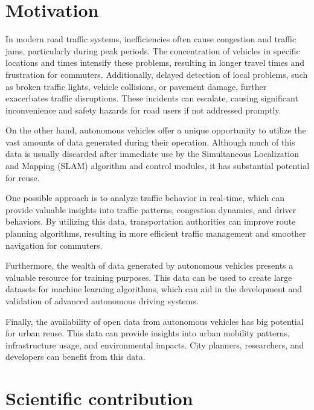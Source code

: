 \section{Motivation}

In modern road traffic systems, inefficiencies often cause congestion and traffic jams, particularly during peak periods. The concentration of vehicles in specific locations and times intensify these problems, resulting in longer travel times and frustration for commuters. Additionally, delayed detection of local problems, such as broken traffic lights, vehicle collisions, or pavement damage, further exacerbates traffic disruptions. These incidents can escalate, causing significant inconvenience and safety hazards for road users if not addressed promptly.


On the other hand, autonomous vehicles offer a unique opportunity to utilize the vast amounts of data generated during their operation. Although much of this data is usually discarded after immediate use by the Simultaneous Localization and Mapping (SLAM) algorithm and control modules, it has substantial potential for reuse.

One possible approach is to analyze traffic behavior in real-time, which can provide valuable insights into traffic patterns, congestion dynamics, and driver behaviors. By utilizing this data, transportation authorities can improve route planning algorithms, resulting in more efficient traffic management and smoother navigation for commuters.

Furthermore, the wealth of data generated by autonomous vehicles presents a valuable resource for training purposes. This data can be used to create large datasets for machine learning algorithms, which can aid in the development and validation of advanced autonomous driving systems.  

Finally, the availability of open data from autonomous vehicles has big potential for urban reuse. This data can provide insights into urban mobility patterns, infrastructure usage, and environmental impacts. City planners, researchers, and developers can benefit from this data.

\section{Scientific contribution}

